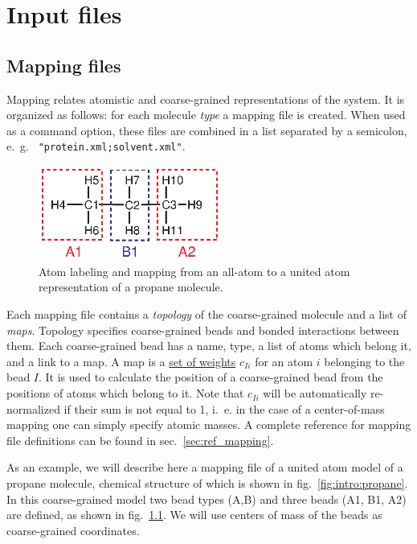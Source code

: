 \chapter{Input files}
\label{sec:inputfiles}

\section{Mapping files}
\label{sec:mapping_files}

Mapping relates atomistic and coarse-grained representations of the system. It is organized as follows: for each molecule {\em type} a mapping file is created. When used as a command option, these files are combined in a list separated by a semicolon, e.~g. ~\texttt{"protein.xml;solvent.xml"}.

\begin{figure}
  \includegraphics[width=6cm]{usage/fig/propane.eps}
  \caption{Atom labeling and mapping from an all-atom to a united atom representation of a propane molecule.
  \label{fig:propane_map}
}
\end{figure}

Each mapping file contains a {\em topology} of the coarse-grained molecule and a list of {\em maps}. Topology specifies coarse-grained beads and bonded interactions between them. Each coarse-grained bead has a name, type, a list of atoms which belong it, and a link to a map. A map is a \hyperref[sec:mapping_operator]{set of weights} $c_{Ii}$ for an atom $i$ belonging to the bead $I$. It is used to calculate the position of a coarse-grained bead from the positions of atoms which belong to it. Note that $c_{Ii}$ will be automatically re-normalized if their sum is not equal to 1, i.~e. in the case of a center-of-mass mapping one can simply specify atomic masses.
A complete reference for mapping file definitions can be found in sec.~\ref{sec:ref_mapping}.

As an example, we will describe here a mapping file of a united atom model of a propane molecule, chemical structure of which is shown in fig.~\ref{fig:intro:propane}. In this coarse-grained model two bead types (A,B) and three beads (A1, B1, A2) are defined, as shown in fig.~\ref{fig:propane_map}. We will use centers of mass of the beads as  coarse-grained coordinates.

